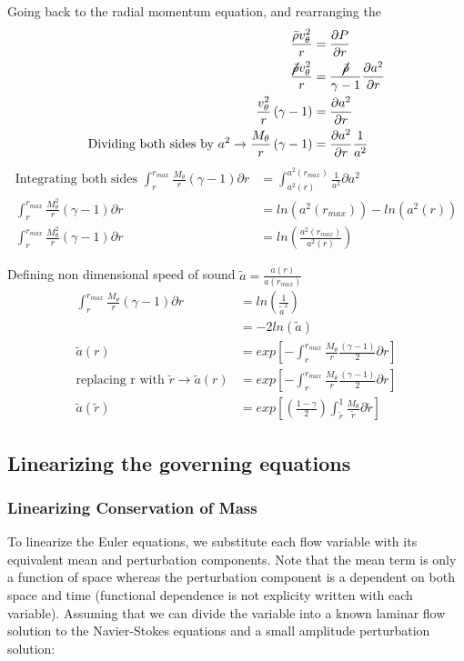 Going back to the radial momentum equation, and rearranging the 
\begin{align*}
\frac{\bar{\rho} v_{\theta}^2}{r} 
&=\frac{\partial P}{\partial r}\\
\frac{\cancel{\bar{\rho}} v_{\theta}^2}{r} 
&=\frac{\cancel{\bar{\rho}}}{\gamma -1}\frac{\partial a^2}{\partial r}\\
\frac{v_{\theta}^2}{r}\left(\gamma -1\right) &= \frac{\partial a^2}{\partial r}\\ \text{Dividing both sides by } a^2 \rightarrow \frac{M_{\theta}}{r}\left(\gamma - 1\right) &= \frac{\partial a^2}{\partial r} \frac{1}{a^2}
\end{align*}
\begin{align*}
\text{Integrating both sides } \int_{r}^{r_{max}}\frac{M_{\theta}}{r}\left(\gamma - 1\right){\partial r}  &=\int_{a^2(r)}^{a^2(r_{max})}\frac{1}{a^2}  {\partial a^2}\\
\int_{r}^{r_{max}}\frac{M^2_{\theta}}{r}\left(\gamma - 1\right){\partial r}  &=ln(a^2(r_{max})) - ln(a^2(r)) \\
\int_{r}^{r_{max}}\frac{M^2_{\theta}}{r}\left(\gamma - 1\right){\partial r}  &=ln\left(\frac{a^2(r_{max})}{a^2(r)}\right) 
\end{align*}

Defining non dimensional speed of sound $\tilde{a} = \frac{a(r)}{a(r_{max})}$
\begin{align*}
\int_{r}^{r_{max}}\frac{M_{\theta}}{r}\left(\gamma - 1\right){\partial r}  &=ln\left(\frac{1}{\tilde{a}^2}\right) \\
&= -2ln(\tilde{a})\\
\tilde{a}(r) &= exp\left[-\int_{r}^{r_{max}}\frac{M_{\theta}}{r}\frac{\left(\gamma - 1\right)}{2}{\partial r}\right] \\ \text{replacing r with }\tilde{r} \rightarrow \tilde{a}(r) &= exp\left[-\int_{r}^{r_{max}}\frac{M_{\theta}}{r}\frac{\left(\gamma - 1\right)}{2}{\partial r}\right]		\\
\tilde{a}(\tilde{r}) &= exp\left[\left(\frac{1 - \gamma}{2}\right)\int_{\tilde{r}}^{1}\frac{M_{\theta}}{\tilde{r}}{\partial \tilde{r}}\right]	
\end{align*}
\subsection{Linearizing the governing equations}
\subsubsection{Linearizing Conservation of Mass}
To linearize the Euler equations, we substitute each flow variable with its equivalent mean and perturbation components. Note that the mean term is only a function of space whereas the perturbation component is a dependent on both space and time (functional dependence is not explicity written with each variable). Assuming that we can divide the variable into a known laminar flow solution to the Navier-Stokes equations and a small amplitude perturbation solution:

